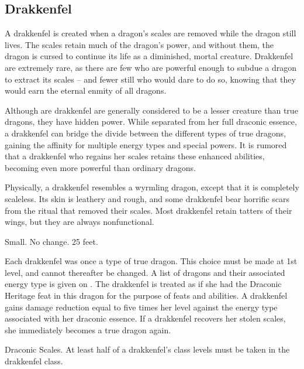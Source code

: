     \subsection{Drakkenfel}

        A drakkenfel is created when a dragon's scales are removed while the dragon still lives. The scales retain much of the dragon's power, and without them, the dragon is cursed to continue its life as a diminished, mortal creature. Drakkenfel are extremely rare, as there are few who are powerful enough to subdue a dragon to extract its scales -- and fewer still who would dare to do so, knowing that they would earn the eternal enmity of all dragons.

        Although are drakkenfel are generally considered to be a lesser creature than true dragons, they have hidden power. While separated from her full draconic essence, a drakkenfel can bridge the divide between the different types of true dragons, gaining the affinity for multiple energy types and special powers. It is rumored that a drakkenfel who regains her scales retains these enhanced abilities, becoming even more powerful than ordinary dragons.

        Physically, a drakkenfel resembles a wyrmling dragon, except that it is completely scaleless. Its skin is leathery and rough, and some drakkenfel bear horrific scars from the ritual that removed their scales. Most drakkenfel retain tatters of their wings, but they are always nonfunctional.

         Small.
         No change.
         25 feet.
        \begin{itemize}
             Each drakkenfel was once a type of true dragon. This choice must be made at 1st level, and cannot thereafter be changed. A list of dragons and their associated energy type is given on . The drakkenfel is treated as if she had the Draconic Heritage feat in this dragon for the purpose of feats and abilities.
             A drakkenfel gains damage reduction equal to five times her level against the energy type associated with her draconic essence.
             If a drakkenfel recovers her stolen scales, she immediately becomes a true dragon again.
        \end{itemize}
         Draconic Scales.
         At least half of a drakkenfel's class levels must be taken in the drakkenfel class.

